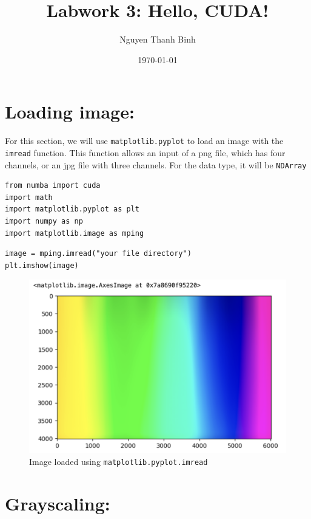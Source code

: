 \documentclass{article}
\title{\textbf{Labwork 3: Hello, CUDA!}}
\author{Nguyen Thanh Binh}
\date{\today}
\begin{document}
\maketitle

\section{Loading image:}

For this section, we will use \texttt{matplotlib.pyplot} to load an image with the \texttt{imread} function. This function allows an input of a png file, which has four channels, or an jpg file with three channels. For the data type, it will be \texttt{NDArray}

\begin{verbatim}
from numba import cuda
import math
import matplotlib.pyplot as plt
import numpy as np
import matplotlib.image as mping
\end{verbatim}

\begin{verbatim}
image = mping.imread("your file directory")
plt.imshow(image)
\end{verbatim}

\begin{figure}
    \centering
    \includegraphics[width=1\linewidth]{sample.png}
    \caption{Image loaded using \texttt{matplotlib.pyplot.imread}}
    \label{fig:placeholder}
\end{figure}

\section{Grayscaling:}
\end{document}
